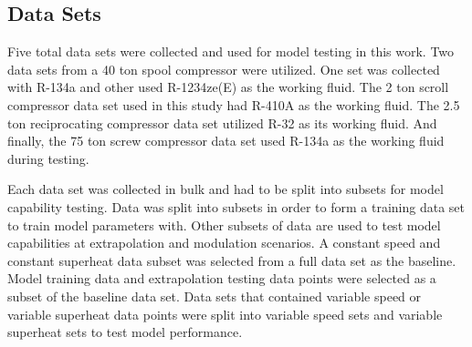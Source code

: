 \documentclass[preprint,11pt,authoryear]{elsarticle}
\begin{document}
\subsection{Data Sets}

Five total data sets were collected and used for model testing in this work. Two data sets from a 40 ton spool compressor were utilized. One set was collected with R-134a and other used R-1234ze(E) as the working fluid. The 2 ton scroll compressor data set used in this study had R-410A as the working fluid. The 2.5 ton reciprocating compressor data set utilized R-32 as its working fluid. And finally, the 75 ton screw compressor data set used R-134a as the working fluid during testing.

\begin{table}[h]
\caption{Information on the data sets collected.}
\label{Tab:data_info}
\begin{center}
\end{center}
\end{table}


Each data set was collected in bulk and had to be split into subsets for model capability testing. Data was split into subsets in order to form a training data set to train model parameters with. Other subsets of data are used to test model capabilities at extrapolation and modulation scenarios. A constant speed and constant superheat data subset was selected from a full data set as the baseline. Model training data and extrapolation testing data points were selected as a subset of the baseline data set. Data sets that contained variable speed or variable superheat data points were split into variable speed sets and variable superheat sets to test model performance.
\end{document}

